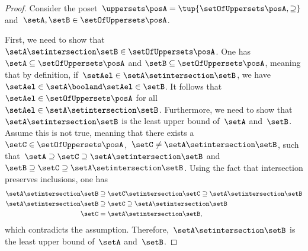 \begin{proof}
	Consider the poset~$\uppersets \posA=\tup{\setOfUppersets \posA,\supseteq}$ and~$\setA,\setB\in \setOfUppersets \posA$.

	First, we need to show that~$\setA\setintersection \setB\in \setOfUppersets \posA$.
	One has~$\setA \subseteq \setOfUppersets \posA$ and $\setB\subseteq \setOfUppersets \posA$, meaning that by definition, if~$\setAel\in \setA\setintersection \setB$, we have~$\setAel \in \setA \booland \setAel \in \setB$.
	It follows that~$\setAel \in \setOfUppersets \posA$ for all~$\setAel \in \setA\setintersection \setB$.
	Furthermore, we need to show that~$\setA\setintersection \setB$ is the least upper bound of~$\setA$ and~$\setB$.
	Assume this is not true, meaning that there exists a~$\setC\in \setOfUppersets \posA$,~$\setC\neq \setA\setintersection \setB$, such that~$\setA\supseteq \setC\supseteq \setA\setintersection \setB$ and~$\setB\supseteq \setC\supseteq \setA\setintersection \setB$.
	Using the fact that intersection preserves inclusions, one has
	\begin{equation}
		\begin{aligned}
			\setA\setintersection \setB & \supseteq \setC\setintersection \setC \supseteq \setA\setintersection \setB \\
			\setA\setintersection \setB & \supseteq \setC \supseteq \setA\setintersection \setB           \\
			\setC           & = \setA\setintersection \setB,
		\end{aligned}
	\end{equation}
	which contradicts the assumption.
	Therefore,~$\setA\setintersection \setB$ is the least upper bound of~$\setA$ and~$\setB$.


\end{proof}

